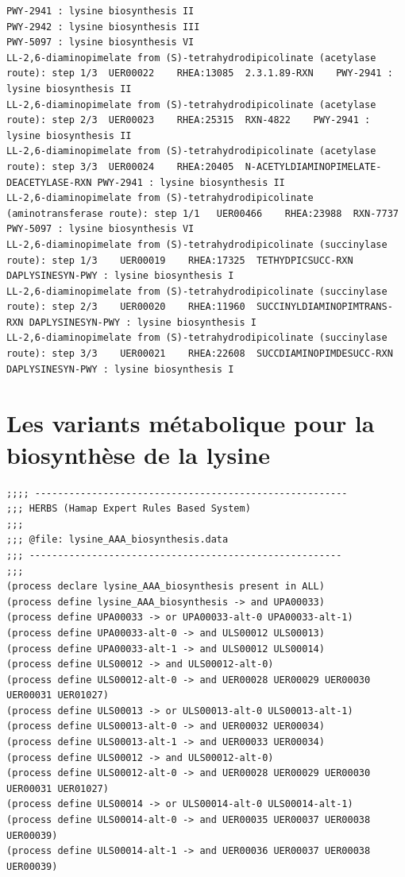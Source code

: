 \begin{adjustbox}{width=\textwidth}
\begin{lstlisting}[basicstyle=\tiny\normalfont\ttfamily,tabsize=2,showtabs=true,caption=DAP\_uer\_metacyc.tsv]
PWY-2941 : lysine biosynthesis II 
PWY-2942 : lysine biosynthesis III 
PWY-5097 : lysine biosynthesis VI 
LL-2,6-diaminopimelate from (S)-tetrahydrodipicolinate (acetylase route): step 1/3	UER00022	RHEA:13085	2.3.1.89-RXN	PWY-2941 : lysine biosynthesis II 
LL-2,6-diaminopimelate from (S)-tetrahydrodipicolinate (acetylase route): step 2/3	UER00023	RHEA:25315	RXN-4822	PWY-2941 : lysine biosynthesis II 
LL-2,6-diaminopimelate from (S)-tetrahydrodipicolinate (acetylase route): step 3/3	UER00024	RHEA:20405	N-ACETYLDIAMINOPIMELATE-DEACETYLASE-RXN	PWY-2941 : lysine biosynthesis II 
LL-2,6-diaminopimelate from (S)-tetrahydrodipicolinate (aminotransferase route): step 1/1	UER00466	RHEA:23988	RXN-7737	PWY-5097 : lysine biosynthesis VI 
LL-2,6-diaminopimelate from (S)-tetrahydrodipicolinate (succinylase route): step 1/3	UER00019	RHEA:17325	TETHYDPICSUCC-RXN	DAPLYSINESYN-PWY : lysine biosynthesis I 
LL-2,6-diaminopimelate from (S)-tetrahydrodipicolinate (succinylase route): step 2/3	UER00020	RHEA:11960	SUCCINYLDIAMINOPIMTRANS-RXN	DAPLYSINESYN-PWY : lysine biosynthesis I 
LL-2,6-diaminopimelate from (S)-tetrahydrodipicolinate (succinylase route): step 3/3	UER00021	RHEA:22608	SUCCDIAMINOPIMDESUCC-RXN	DAPLYSINESYN-PWY : lysine biosynthesis I 
\end{lstlisting}
\end{adjustbox}

\section{Les variants métabolique pour la biosynthèse de la lysine}
\begin{lstlisting}[basicstyle=\tiny\normalfont\ttfamily,caption=data/processes/lysine\_DAP\_biosynthesis.data]
;;;; -------------------------------------------------------
;;; HERBS (Hamap Expert Rules Based System)
;;;
;;; @file: lysine_AAA_biosynthesis.data
;;; -------------------------------------------------------
;;;
(process declare lysine_AAA_biosynthesis present in ALL)
(process define lysine_AAA_biosynthesis -> and UPA00033)
(process define UPA00033 -> or UPA00033-alt-0 UPA00033-alt-1)
(process define UPA00033-alt-0 -> and ULS00012 ULS00013)
(process define UPA00033-alt-1 -> and ULS00012 ULS00014)
(process define ULS00012 -> and ULS00012-alt-0)
(process define ULS00012-alt-0 -> and UER00028 UER00029 UER00030 UER00031 UER01027)
(process define ULS00013 -> or ULS00013-alt-0 ULS00013-alt-1)
(process define ULS00013-alt-0 -> and UER00032 UER00034)
(process define ULS00013-alt-1 -> and UER00033 UER00034)
(process define ULS00012 -> and ULS00012-alt-0)
(process define ULS00012-alt-0 -> and UER00028 UER00029 UER00030 UER00031 UER01027)
(process define ULS00014 -> or ULS00014-alt-0 ULS00014-alt-1)
(process define ULS00014-alt-0 -> and UER00035 UER00037 UER00038 UER00039)
(process define ULS00014-alt-1 -> and UER00036 UER00037 UER00038 UER00039)
\end{lstlisting}

